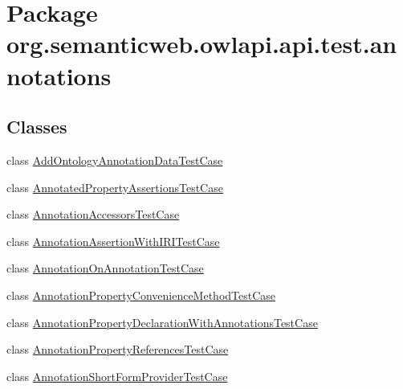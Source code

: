 \hypertarget{namespaceorg_1_1semanticweb_1_1owlapi_1_1api_1_1test_1_1annotations}{\section{Package org.\-semanticweb.\-owlapi.\-api.\-test.\-annotations}
\label{namespaceorg_1_1semanticweb_1_1owlapi_1_1api_1_1test_1_1annotations}
}
\subsection*{Classes}
\begin{DoxyCompactItemize}
\item 
class \hyperlink{classorg_1_1semanticweb_1_1owlapi_1_1api_1_1test_1_1annotations_1_1_add_ontology_annotation_data_test_case}{Add\-Ontology\-Annotation\-Data\-Test\-Case}
\item 
class \hyperlink{classorg_1_1semanticweb_1_1owlapi_1_1api_1_1test_1_1annotations_1_1_annotated_property_assertions_test_case}{Annotated\-Property\-Assertions\-Test\-Case}
\item 
class \hyperlink{classorg_1_1semanticweb_1_1owlapi_1_1api_1_1test_1_1annotations_1_1_annotation_accessors_test_case}{Annotation\-Accessors\-Test\-Case}
\item 
class \hyperlink{classorg_1_1semanticweb_1_1owlapi_1_1api_1_1test_1_1annotations_1_1_annotation_assertion_with_i_r_i_test_case}{Annotation\-Assertion\-With\-I\-R\-I\-Test\-Case}
\item 
class \hyperlink{classorg_1_1semanticweb_1_1owlapi_1_1api_1_1test_1_1annotations_1_1_annotation_on_annotation_test_case}{Annotation\-On\-Annotation\-Test\-Case}
\item 
class \hyperlink{classorg_1_1semanticweb_1_1owlapi_1_1api_1_1test_1_1annotations_1_1_annotation_property_convenience_method_test_case}{Annotation\-Property\-Convenience\-Method\-Test\-Case}
\item 
class \hyperlink{classorg_1_1semanticweb_1_1owlapi_1_1api_1_1test_1_1annotations_1_1_annotation_property_declaration_with_annotations_test_case}{Annotation\-Property\-Declaration\-With\-Annotations\-Test\-Case}
\item 
class \hyperlink{classorg_1_1semanticweb_1_1owlapi_1_1api_1_1test_1_1annotations_1_1_annotation_property_references_test_case}{Annotation\-Property\-References\-Test\-Case}
\item 
class \hyperlink{classorg_1_1semanticweb_1_1owlapi_1_1api_1_1test_1_1annotations_1_1_annotation_short_form_provider_test_case}{Annotation\-Short\-Form\-Provider\-Test\-Case}

\end{DoxyCompactItemize}
